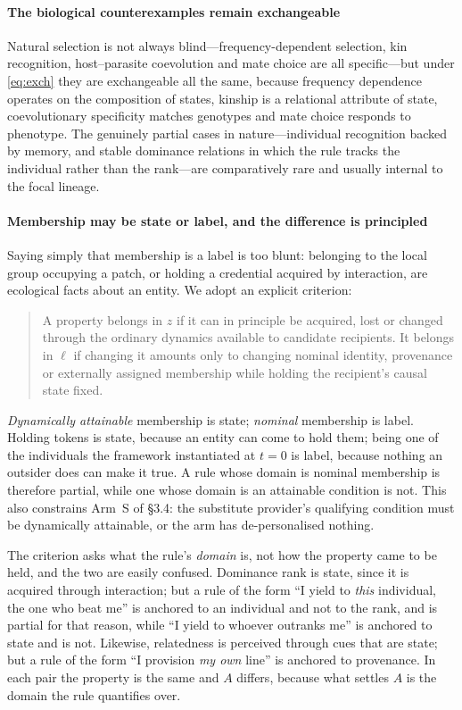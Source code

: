 \documentclass[review,3p,times]{elsarticle}
\begin{document}
\paragraph{The biological counterexamples remain exchangeable}
Natural selection is not always blind---frequency-dependent selection, kin
recognition, host--parasite coevolution and mate choice are all specific---but
under \eqref{eq:exch} they are exchangeable all the same, because frequency
dependence operates on the composition of states, kinship is a relational
attribute of state, coevolutionary specificity matches genotypes and mate
choice responds to phenotype. The genuinely partial cases in
nature---individual recognition backed by memory, and stable dominance
relations in which the rule tracks the individual rather than the
rank---are comparatively rare and usually internal to the focal lineage.

\paragraph{Membership may be state or label, and the difference is
principled}
Saying simply that membership is a label is too blunt: belonging to the local
group occupying a patch, or holding a credential acquired by interaction, are
ecological facts about an entity. We adopt an explicit criterion:

\begin{quote}
A property belongs in $z$ if it can in principle be acquired, lost or
changed through the ordinary dynamics available to candidate recipients. It
belongs in $\ell$ if changing it amounts only to changing nominal identity,
provenance or externally assigned membership while holding the recipient's
causal state fixed.
\end{quote}

\emph{Dynamically attainable} membership is state; \emph{nominal} membership is
label. Holding tokens is state, because an entity can come to hold them; being
one of the individuals the framework instantiated at $t=0$ is label, because
nothing an outsider does can make it true. A rule whose domain is nominal
membership is therefore partial, while one whose domain is an attainable
condition is not. This also constrains Arm~S of \S3.4: the substitute
provider's qualifying condition must be dynamically attainable, or the arm has
de-personalised nothing.

The criterion asks what the rule's \emph{domain} is, not how the property came
to be held, and the two are easily confused. Dominance rank is state, since it
is acquired through interaction; but a rule of the form ``I yield to
\emph{this} individual, the one who beat me'' is anchored to an individual and
not to the rank, and is partial for that reason, while ``I yield to whoever
outranks me'' is anchored to state and is not. Likewise, relatedness is
perceived through cues that are state; but a rule of the form ``I provision
\emph{my own} line'' is anchored to provenance. In each pair the property is
the same and $A$ differs, because what settles $A$ is the domain the rule
quantifies over.
\end{document}
